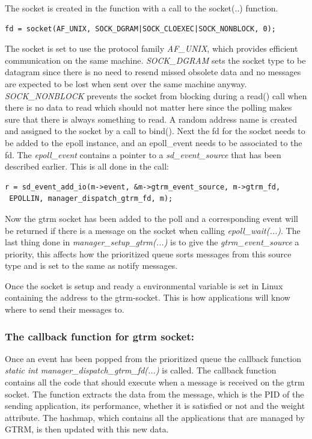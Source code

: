 \documentclass[nobiblatex]{LTHthesis}
\begin{document}
The socket is created in the function  with a call to the socket(..) function.
\begin{verbatim}
fd = socket(AF_UNIX, SOCK_DGRAM|SOCK_CLOEXEC|SOCK_NONBLOCK, 0);
\end{verbatim}

The socket is set to use the protocol family \emph{AF\_UNIX}, which provides efficient communication on the same machine. \emph{SOCK\_DGRAM} sets the socket type to be datagram since there is no need to resend missed obsolete data and no messages are expected to be lost when sent over the same machine anyway. \emph{SOCK\_NONBLOCK} prevents the socket from blocking during a read() call when there is no data to read which should not matter here since the polling makes sure that there is always something to read. A random address name is created and assigned to the socket by a call to bind(). Next the fd for the socket needs to be added to the epoll instance, and an epoll\_event needs to be associated to the fd. The \emph{epoll\_event} contains a pointer to a \emph{sd\_event\_source} that has been described earlier. This is all done in the call:  

\begin{verbatim}
r = sd_event_add_io(m->event, &m->gtrm_event_source, m->gtrm_fd,
 EPOLLIN, manager_dispatch_gtrm_fd, m);
\end{verbatim}

Now the gtrm socket has been added to the poll and a corresponding event will be returned if there is a message on the socket when calling \emph{epoll\_wait(...)}. 
The last thing done in \emph{manager\_setup\_gtrm(...)} is to give the \emph{gtrm\_event\_source} a priority, this affects how the prioritized queue sorts messages from this source type and is set to the same as notify messages.

Once the socket is setup and ready a environmental variable is set in Linux containing the address to the gtrm-socket. This is how applications will know where to send their messages to.


\subsubsection{The callback function for gtrm socket:}
Once an event has been popped from the prioritized queue the callback function \emph{static int manager\_dispatch\_gtrm\_fd(...)} is called. 
The callback function contains all the code that should execute when a message is received on the gtrm socket. The function extracts the data from the message, which is the PID of the sending application, its performance, whether it is satisfied or not and the weight attribute. 
The hashmap, which contains all the applications that are managed by GTRM, is then updated with this new data. 
\end{document}
